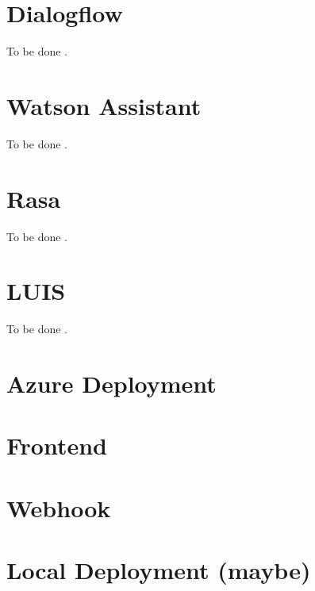 \section{Dialogflow}
To be done \cite{dialogflow}.

\section{Watson Assistant}
To be done \cite{watsonassistant}.
 
\section{Rasa}
To be done \cite{rasa}.

\section{LUIS}
To be done \cite{luisdocs}.


\section{Azure Deployment}
\section{Frontend}
\section{Webhook}
\section{Local Deployment (maybe)}